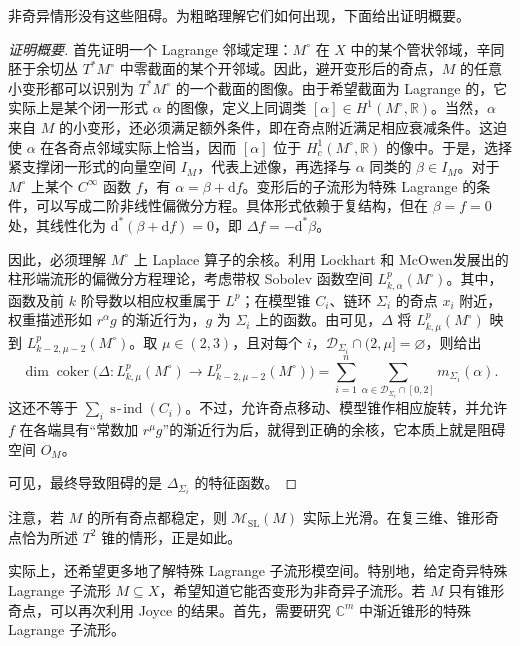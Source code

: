 非奇异情形没有这些阻碍。为粗略理解它们如何出现，下面给出证明概要。
\begin{proof}[证明概要]
首先证明一个 Lagrange 邻域定理：$M^\circ$ 在 $X$ 中的某个管状邻域，辛同胚于余切丛 $T^*M^\circ$ 中零截面的某个开邻域。因此，避开变形后的奇点，$M$ 的任意小变形都可以识别为 $T^*M^\circ$ 的一个截面的图像。由于希望截面为 Lagrange 的，它实际上是某个闭一形式 $\alpha$ 的图像，定义上同调类 $[\alpha]\in H^1(M^\circ,\mathbb R)$。当然，$\alpha$ 来自 $M$ 的小变形，还必须满足额外条件，即在奇点附近满足相应衰减条件。这迫使 $\alpha$ 在各奇点邻域实际上恰当，因而 $[\alpha]$ 位于 $H_c^1(M^\circ,\mathbb R)$ 的像中。于是，选择紧支撑闭一形式的向量空间 $I_M$，代表上述像，再选择与 $\alpha$ 同类的 $\beta\in I_M$。对于 $M^\circ$ 上某个 $C^\infty$ 函数 $f$，有 $\alpha=\beta+\mathrm df$。变形后的子流形为特殊 Lagrange 的条件，可以写成二阶非线性偏微分方程。具体形式依赖于复结构，但在 $\beta=f=0$ 处，其线性化为 $\mathrm d^*(\beta+\mathrm df)=0$，即 $\Delta f=-\mathrm d^*\beta$。

因此，必须理解 $M^\circ$ 上 Laplace 算子的余核。利用 Lockhart 和 McOwen发展出的柱形端流形的偏微分方程理论，考虑带权 Sobolev 函数空间 $L^p_{k,\alpha}(M^\circ)$。其中，函数及前 $k$ 阶导数以相应权重属于 $L^p$；在模型锥 $C_i$、链环 $\Sigma_i$ 的奇点 $x_i$ 附近，权重描述形如 $r^\alpha g$ 的渐近行为，$g$ 为 $\Sigma_i$ 上的函数。由可见，$\Delta$ 将 $L^p_{k,\mu}(M^\circ)$ 映到 $L^p_{k-2,\mu-2}(M^\circ)$。取 $\mu\in(2,3)$，且对每个 $i$，$\mathcal D_{\Sigma_i}\cap(2,\mu]=\varnothing$，则给出
\[
\dim\operatorname{coker}\bigl(
\Delta\colon L^p_{k,\mu}(M^\circ)
\longrightarrow L^p_{k-2,\mu-2}(M^\circ)\bigr)
=\sum_{i=1}^n\sum_{\alpha\in\mathcal D_{\Sigma_i}\cap[0,2]}
m_{\Sigma_i}(\alpha).
\]
这还不等于 $\sum_i\operatorname{s\!\text{-}\!ind}(C_i)$。不过，允许奇点移动、模型锥作相应旋转，并允许 $f$ 在各端具有“常数加 $r^\mu g$”的渐近行为后，就得到正确的余核，它本质上就是阻碍空间 $O_M$。

可见，最终导致阻碍的是 $\Delta_{\Sigma_i}$ 的特征函数。
\end{proof}

注意，若 $M$ 的所有奇点都稳定，则 $\mathcal M_{\mathrm{SL}}(M)$ 实际上光滑。在复三维、锥形奇点恰为所述 $T^2$ 锥的情形，正是如此。

实际上，还希望更多地了解特殊 Lagrange 子流形模空间。特别地，给定奇异特殊 Lagrange 子流形 $M\subseteq X$，希望知道它能否变形为非奇异子流形。若 $M$ 只有锥形奇点，可以再次利用 Joyce 的结果。首先，需要研究 $\mathbb C^m$ 中渐近锥形的特殊 Lagrange 子流形。

